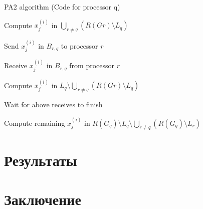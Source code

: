 \documentclass[a4paper,12pt]{report}
\begin{document}
    \begin{algorithm}
    \caption{PA2 algorithm (Code for processor q)}
    \label{algo:PA2}
    \begin{algorithmic}[1]
            \State Compute $x^{(i)}_j$ in $\bigcup_{r \neq q} (R(Gr) \setminus L_q)$
        \EndFor
        
            \State Send $x^{(i)}_j$ in $B_{r,q}$ to processor $r$
        \EndFor
        
            \State Receive $x^{(i)}_j$ in $B_{r,q}$ from processor $r$
        \EndFor
        
            \State Compute $x^{(i)}_j$ in $L_q \setminus \bigcup_{r \neq q} (R(Gr) \setminus L_q)$ 
        \EndFor
        
        \State Wait for above receives to finish
        
            \State Compute remaining $x^{(i)}_j$ in $R(G_q) \setminus L_q \setminus \bigcup_{r \neq q} (R(G_q) \setminus L_r)$
        \EndFor
    \end{algorithmic}
    \end{algorithm}

    \chapter{ Результаты }
    
    
    \chapter{ Заключение }
    
    
\end{document}

